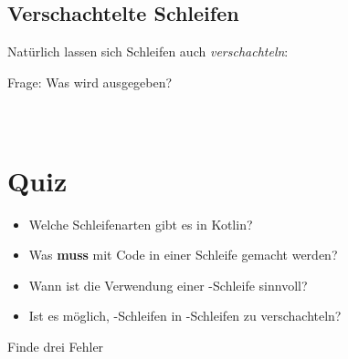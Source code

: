 \subsection{Verschachtelte Schleifen}
\begin{frame}
    \slidehead

    \vspace{-1.2ex}
    Natürlich lassen sich Schleifen auch \textit{verschachteln}:
    \vspace{-1.2ex}

    \pause
    \vspace{-1.5ex}
    \begin{block}{Frage: Was wird ausgegeben?}\pause
        \\
        \\
        \\
    \end{block}
\end{frame}

\livecoding

\section{Quiz}
\begin{frame}
    \slidehead
    \pause
    \begin{itemize}
        \item Welche Schleifenarten gibt es in Kotlin?\pause
        \item Was \textbf{muss} mit Code in einer Schleife gemacht werden?\pause
        \item Wann ist die Verwendung einer -Schleife sinnvoll?\pause
        \item Ist es möglich, -Schleifen in -Schleifen zu verschachteln?\pause
    \end{itemize}
    \begin{block}{Finde drei Fehler}
    \end{block}
\end{frame}

